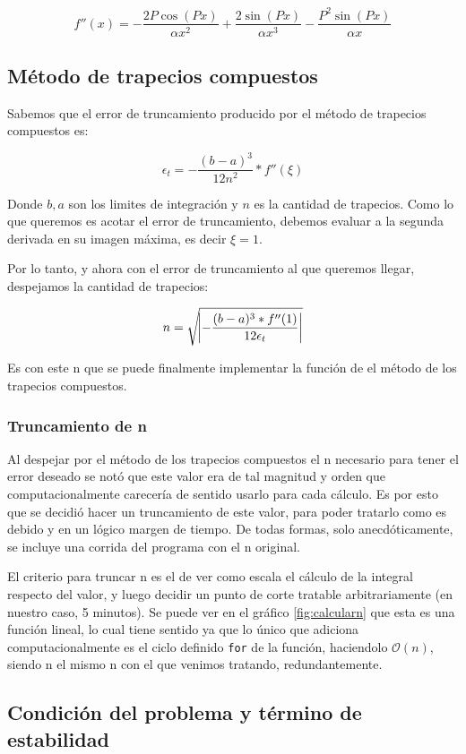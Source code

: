 \documentclass[11pt,a4paper]{article}
\begin{document}
\[ f''(x) = - \frac{2 P \cos{(P x)}}{\alpha x^2} + \frac{2 \sin{(P x)}}{\alpha x^3} - \frac{P^2 \sin{(P x)}}{\alpha x}\]

\subsection{Método de trapecios compuestos}

Sabemos que el error de truncamiento producido por el método de trapecios compuestos es:

\[ \epsilon_t = - \frac{{(b - a)}^3}{12 n^2} * f''(\xi) \]

Donde \(b, a\) son los limites de integración y \(n\) es la cantidad de trapecios. Como lo que queremos es acotar el error de truncamiento, debemos evaluar a la segunda derivada en su imagen máxima, es decir \(\xi = 1 \).

Por lo tanto, y ahora con el error de truncamiento al que queremos llegar, despejamos la cantidad de trapecios:

\[ n = \sqrt{ \abs{ - \frac{(b - a)^3 * f''(1)}{12 \epsilon_t}}} \]

Es con este n que se puede finalmente implementar la función de el método de los trapecios compuestos.

\subsubsection{Truncamiento de n}

Al despejar por el método de los trapecios compuestos el n necesario para tener el error deseado se notó que este valor era de tal magnitud y orden que computacionalmente carecería de sentido usarlo para cada cálculo. Es por esto que se decidió hacer un truncamiento de este valor, para poder tratarlo como es debido y en un lógico margen de tiempo. De todas formas, solo anecdóticamente, se incluye una corrida del programa con el n original.

El criterio para truncar n es el de ver como escala el cálculo de la integral respecto del valor, y luego decidir un punto de corte tratable arbitrariamente (en nuestro caso, 5 minutos). Se puede ver en el gráfico \ref{fig:calcularn} que esta es una función lineal, lo cual tiene sentido ya que lo único que adiciona computacionalmente es el ciclo definido \texttt{for} de la función, haciendolo \(\mathcal{O}(n)\), siendo n el mismo n con el que venimos tratando, redundantemente.

\subsection{Condición del problema y término de estabilidad}
\end{document}
